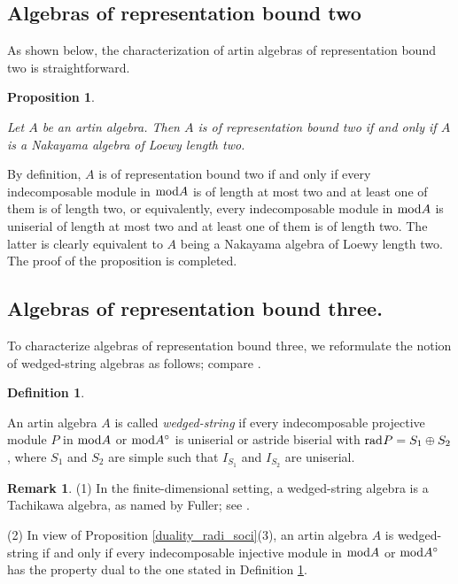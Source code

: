 \documentclass[10pt]{amsart}
\newtheorem{Prop}[Theo]{Proposition}
\theoremstyle{definition}
\newtheorem{Defn}[Theo]{Definition}
\newtheorem{Remark}[Theo]{Remark}
\newcommand{\mmod}{{\rm mod}}
\newcommand{\rad}{{\rm rad}\hspace{.5pt}}
\begin{document}
\subsection{\sc Algebras of representation bound two} As shown below, the characterization of artin algebras of representation bound two is straightforward. 

\begin{Prop}\label{rb2}

Let $A$ be an artin algebra. Then $A$ is of representation bound two if and only if $A$ is a Nakayama algebra of Loewy length two. 

\end{Prop}

 By definition, $A$ is of representation bound two if and only if every indecomposable module in $\mmod A$ is of length at most two and at least one of them is of length two, or equivalently, every indecomposable module in $\mmod A$ is uniserial of length at most two and at least one of them is of length two. The latter is clearly equivalent to $A$ being a Nakayama algebra of Loewy length two. The proof of the proposition is completed.

\subsection{\sc Algebras of representation bound three.} To characterize algebras of representation bound three, we reformulate the notion of wedged-string algebras as follows; compare \cite[(3.5)]{LiY}.

\begin{Defn}\label{3sa_def} 

An artin algebra $A$ is called {\it wedged-string} if every indecomposable projective module $P$ in $\mmod A$ or $\mmod A^\circ$ is uniserial or astride biserial with $\rad P=S_1\oplus S_2$, where $S_1$ and $S_2$ are simple such that $I_{S_1}$ and $I_{S_2}$ are uniserial.

\end{Defn}

\begin{Remark} \label{3sa_rem} (1)  In the finite-dimensional setting, a wedged-string algebra is a Tachikawa algebra, as named by Fuller; see \cite[(2.1)]{Ful}.

\noindent (2) In view of Proposition \ref{duality_radi_soci}(3), an artin algebra $A$ is wedged-string if and only if every indecomposable injective module in $\mmod A$ or $\mmod A^\circ$ has the property dual to the one stated in Definition \ref{3sa_def}.




\end{Remark} 
\end{document}

